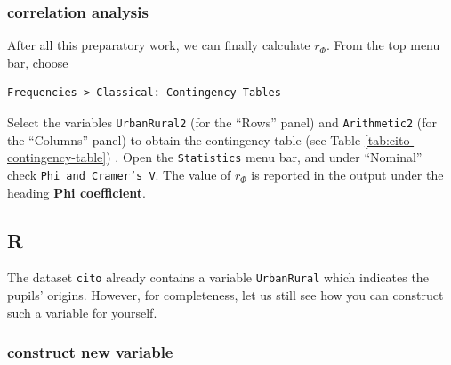 \documentclass[
]{book}
\newenvironment{Shaded}{\begin{snugshade}}{\end{snugshade}}
\newcommand{\CommentTok}[1]{\textcolor[rgb]{0.56,0.35,0.01}{\textit{#1}}}
\newcommand{\DecValTok}[1]{\textcolor[rgb]{0.00,0.00,0.81}{#1}}
\newcommand{\FunctionTok}[1]{\textcolor[rgb]{0.00,0.00,0.00}{#1}}
\newcommand{\NormalTok}[1]{#1}
\newcommand{\OtherTok}[1]{\textcolor[rgb]{0.56,0.35,0.01}{#1}}
\newcommand{\SpecialCharTok}[1]{\textcolor[rgb]{0.00,0.00,0.00}{#1}}
\begin{document}
\hypertarget{correlation-analysis-1}{%
\subsubsection{correlation analysis}\label{correlation-analysis-1}}

After all this preparatory work, we can finally calculate \(r_\Phi\). From the top menu bar, choose

\begin{verbatim}
Frequencies > Classical: Contingency Tables
\end{verbatim}

Select the variables \texttt{UrbanRural2} (for the ``Rows'' panel) and \texttt{Arithmetic2} (for the ``Columns'' panel) to obtain the contingency table (see Table \ref{tab:cito-contingency-table}) .
Open the \texttt{Statistics} menu bar, and under ``Nominal'' check \texttt{Phi\ and\ Cramer’s\ V}.
The value of \(r_\Phi\) is reported in the output under the heading \textbf{Phi coefficient}.

\hypertarget{r-10}{%
\subsection{R}\label{r-10}}

The dataset \texttt{cito} already contains a variable \texttt{UrbanRural} which indicates the pupils' origins.
However, for completeness, let us still see how you can construct such a variable for yourself.

\hypertarget{construct-new-variable-2}{%
\subsubsection{construct new variable}\label{construct-new-variable-2}}

\begin{Shaded}
\end{Shaded}
\end{document}
